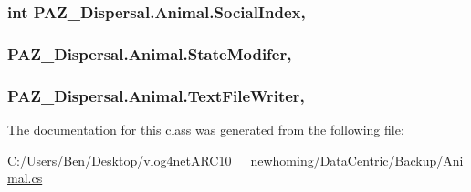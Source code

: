 \hypertarget{class_p_a_z___dispersal_1_1_animal_a3328c62f7d87e809c2a1ae7f7edb8ec9}{
\subsubsection[{Social\-Index}]{\setlength{\rightskip}{0pt plus 5cm}int P\-A\-Z\-\_\-\-Dispersal.\-Animal.\-Social\-Index\hspace{0.3cm}{\ttfamily [get]}, {\ttfamily [set]}}}\label{class_p_a_z___dispersal_1_1_animal_a3328c62f7d87e809c2a1ae7f7edb8ec9}
\hypertarget{class_p_a_z___dispersal_1_1_animal_a5763f42a5f0e97b8fecb3f8291eac9f2}{
\subsubsection[{State\-Modifer}]{ P\-A\-Z\-\_\-\-Dispersal.\-Animal.\-State\-Modifer\hspace{0.3cm}{\ttfamily [get]}, {\ttfamily [set]}}}\label{class_p_a_z___dispersal_1_1_animal_a5763f42a5f0e97b8fecb3f8291eac9f2}
\hypertarget{class_p_a_z___dispersal_1_1_animal_a67c037bed748f53627f9ae487e30bcd4}{
\subsubsection[{Text\-File\-Writer}]{ P\-A\-Z\-\_\-\-Dispersal.\-Animal.\-Text\-File\-Writer\hspace{0.3cm}{\ttfamily [get]}, {\ttfamily [set]}}}\label{class_p_a_z___dispersal_1_1_animal_a67c037bed748f53627f9ae487e30bcd4}


The documentation for this class was generated from the following file\-:\begin{DoxyCompactItemize}
\item 
C\-:/\-Users/\-Ben/\-Desktop/vlog4net\-A\-R\-C10\-\_\-\_\-newhoming/\-Data\-Centric/\-Backup/\hyperlink{_backup_2_animal_8cs}{Animal.\-cs}\end{DoxyCompactItemize}
